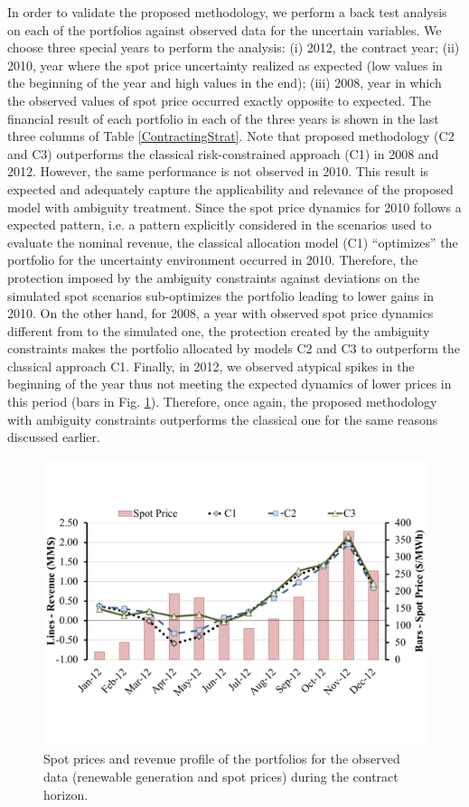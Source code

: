 	In order to validate the proposed methodology, we perform a back test analysis on each of the portfolios against observed data for the uncertain variables. We choose three special years to perform the analysis: (i) 2012, the contract year; (ii) 2010, year where the spot price uncertainty realized as expected (low values in the beginning of the year and high values in the end); (iii) 2008, year in which the observed values of spot price occurred exactly opposite to expected. The financial result of each portfolio in each of the three years is shown in the last three columns of Table \ref{ContractingStrat}. Note that proposed methodology (C2 and C3) outperforms the classical risk-constrained approach (C1) in 2008 and 2012. However, the same performance is not observed in 2010. This result is expected and adequately capture the applicability and relevance of the proposed model with ambiguity treatment. Since the spot price dynamics for 2010 follows a expected pattern, i.e. a pattern explicitly considered in the scenarios used to evaluate the nominal revenue, the classical allocation model (C1) ``optimizes'' the portfolio for the uncertainty environment occurred in 2010. Therefore, the protection imposed by the ambiguity constraints against deviations on the simulated spot scenarios sub-optimizes the portfolio leading to lower gains in 2010. On the other hand, for 2008, a year with observed spot price dynamics different from to the simulated one, the protection created by the ambiguity constraints makes the portfolio allocated by models C2 and C3 to outperform the classical approach C1. Finally, in 2012, we observed atypical spikes in the beginning of the year thus not meeting the expected dynamics of lower prices in this period (bars in Fig. \ref{Backtest_2012}). Therefore, once again, the proposed methodology with ambiguity constraints outperforms the classical one for the same reasons discussed earlier.
%
\begin{figure}[!t]
	\centering
	\includegraphics[viewport= 5 95 717 446, clip, width=0.45 \textwidth]{./Figures/BackTest_2012.pdf}
	\caption{Spot prices and revenue profile of the portfolios for the observed data (renewable generation and spot prices) during the contract horizon.}
	\label{Backtest_2012}
\end{figure}

